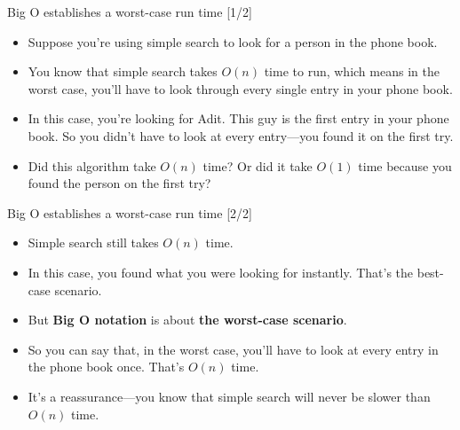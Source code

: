 \documentclass[ignorenonframetext,]{beamer}
\providecommand{\tightlist}{%
  \setlength{\itemsep}{0pt}\setlength{\parskip}{0pt}}
\begin{document}
\begin{frame}{Big O establishes a worst-case run time {[}1/2{]}}
\protect\hypertarget{big-o-establishes-a-worst-case-run-time-12}{}

\begin{itemize}
\tightlist
\item
  Suppose you're using simple search to look for a person in the phone
  book.
\item
  You know that simple search takes \(O(n)\) time to run, which means in
  the worst case, you'll have to look through every single entry in your
  phone book.
\item
  In this case, you're looking for Adit. This guy is the first entry in
  your phone book. So you didn't have to look at every entry---you found
  it on the first try.
\item
  Did this algorithm take \(O(n)\) time? Or did it take \(O(1)\) time
  because you found the person on the first try?
\end{itemize}

\end{frame}

\begin{frame}{Big O establishes a worst-case run time {[}2/2{]}}
\protect\hypertarget{big-o-establishes-a-worst-case-run-time-22}{}

\begin{itemize}
\tightlist
\item
  Simple search still takes \(O(n)\) time.
\item
  In this case, you found what you were looking for instantly. That's
  the best-case scenario.
\item
  But \textbf{Big O notation} is about \textbf{the worst-case scenario}.
\item
  So you can say that, in the worst case, you'll have to look at every
  entry in the phone book once. That's \(O(n)\) time.
\item
  It's a reassurance---you know that simple search will never be slower
  than \(O(n)\) time.
\end{itemize}

\end{frame}
\end{document}
